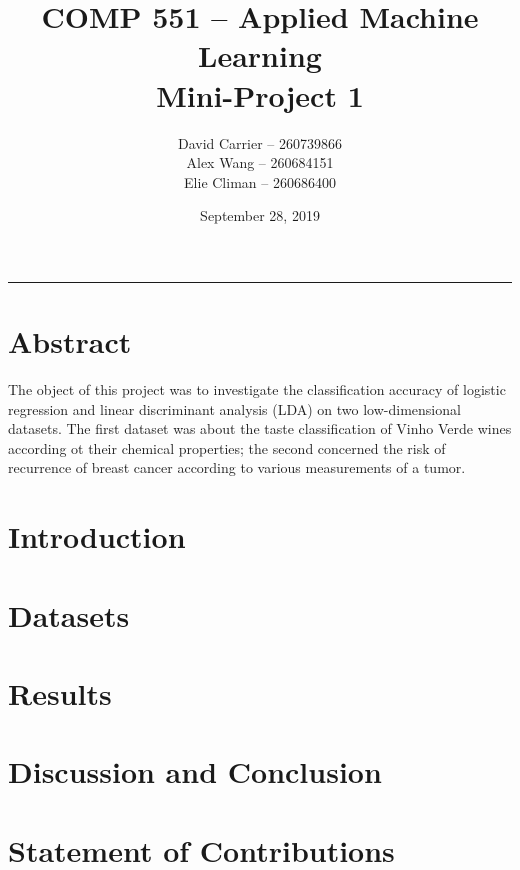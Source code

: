 \documentclass[11pt,letterpaper]{article}
\begin{document}
    \author{David Carrier -- 260739866 \\
        Alex Wang -- 260684151 \\
        Elie Climan -- 260686400}
    \date{September 28, 2019}
    \title{COMP 551 -- Applied Machine Learning \\
    Mini-Project 1}

        \thispagestyle{empty}
        \maketitle
        \vfill
    
    \noindent\rule{0.3\textwidth}{1pt}   
    \section*{Abstract}

        The object of this project was to investigate the classification accuracy of logistic regression and linear discriminant analysis (LDA) on two low-dimensional datasets. The first dataset was about the taste classification of Vinho Verde wines according ot their chemical properties; the second concerned the risk of recurrence of breast cancer according to various measurements of a tumor.
        

    \newpage
    \section{Introduction}
    
    \section{Datasets}
    
    \section{Results}
    
    \section{Discussion and Conclusion}
    
    \section*{Statement of Contributions}
    
\end{document}
